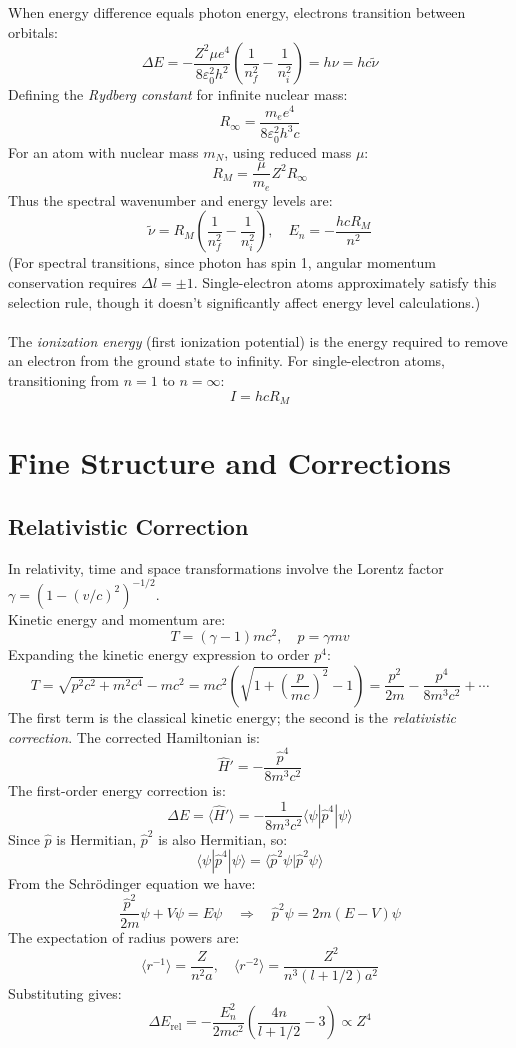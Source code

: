 When energy difference equals photon energy, electrons transition between orbitals:
\[
\Delta E = -\frac{Z^2\mu e^4}{8\varepsilon_0^2 h^2}\left(\frac{1}{n_f^2} - \frac{1}{n_i^2}\right) = h\nu = hc\tilde{\nu}
\]
Defining the \emph{Rydberg constant} for infinite nuclear mass:
\[
R_\infty = \frac{m_e e^4}{8\varepsilon_0^2 h^3 c}
\]
For an atom with nuclear mass $m_N$, using reduced mass $\mu$:
\[
R_M = \frac{\mu}{m_e}Z^2 R_\infty
\]
Thus the spectral wavenumber and energy levels are:
\[
\tilde{\nu} = R_M\left(\frac{1}{n_f^2} - \frac{1}{n_i^2}\right), \quad E_n = -\frac{hcR_M}{n^2}
\]
(For spectral transitions, since photon has spin 1, angular momentum conservation requires $\Delta l = \pm 1$. Single-electron atoms approximately satisfy this selection rule, though it doesn't significantly affect energy level calculations.)\\ \\
The \emph{ionization energy} (first ionization potential) is the energy required to remove an electron from the ground state to infinity. For single-electron atoms, transitioning from $n=1$ to $n=\infty$:
\[
I = hcR_M
\]

\section{Fine Structure and Corrections}

\subsection{Relativistic Correction}

In relativity, time and space transformations involve the Lorentz factor $\gamma = (1-(v/c)^2)^{-1/2}$.\\
Kinetic energy and momentum are:
\[
T = (\gamma-1)mc^2, \quad p = \gamma mv
\]
Expanding the kinetic energy expression to order $p^4$:
\[
T = \sqrt{p^2c^2 + m^2c^4} - mc^2 = mc^2\left(\sqrt{1+\left(\frac{p}{mc}\right)^2} - 1\right) = \frac{p^2}{2m} - \frac{p^4}{8m^3c^2} + \cdots
\]
The first term is the classical kinetic energy; the second is the \emph{relativistic correction}. The corrected Hamiltonian is:
\[
\hat{H}' = -\frac{\hat{p}^4}{8m^3c^2}
\]
The first-order energy correction is:
\[
\Delta E = \langle\hat{H}'\rangle = -\frac{1}{8m^3c^2}\langle\psi|\hat{p}^4|\psi\rangle
\]
Since $\hat{p}$ is Hermitian, $\hat{p}^2$ is also Hermitian, so:
\[
\langle\psi|\hat{p}^4|\psi\rangle = \langle\hat{p}^2\psi|\hat{p}^2\psi\rangle
\]
From the Schrödinger equation we have:
\[
\frac{\hat{p}^2}{2m}\psi + V\psi = E\psi
\quad\Rightarrow\quad
\hat{p}^2\psi = 2m(E-V)\psi
\]
The expectation of radius powers are:
\[
\langle r^{-1}\rangle = \frac{Z}{n^2 a}, \quad \langle r^{-2}\rangle = \frac{Z^2}{n^3(l+1/2)a^2}
\]
Substituting gives:
\[
\Delta E_{\text{rel}} = -\frac{E_n^2}{2mc^2}\left(\frac{4n}{l+1/2} - 3\right) \propto Z^4
\]

